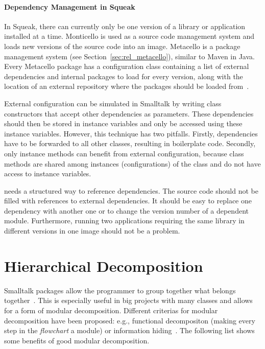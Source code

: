 \paragraph{Dependency Management in Squeak}
In Squeak, there can currently only be one version of a library or application installed at a time. Monticello is used as a source code management system and loads new versions of the source code into an image. Metacello is a package management system (see Section~\ref{sec:rel_metacello}), similar to Maven in Java. Every Metacello package has a configuration class containing a list of external dependencies and internal packages to load for every version, along with the location of an external repository where the packages should be loaded from~\cite{metacellodraft}.

External configuration can be simulated in Smalltalk by writing class constructors that accept other dependencies as parameters. These dependencies should then be stored in instance variables and only be accessed using these instance variables. However, this technique has two pitfalls. Firstly, dependencies have to be forwarded to all other classes, resulting in boilerplate code. Secondly, only instance methods can benefit from external configuration, because class methods are shared among instances (configurations) of the class and do not have access to instance variables.

\msname needs a structured way to reference dependencies. The source code should not be filled with references to external dependencies. It should be easy to replace one dependency with another one or to change the version number of a dependent module. Furthermore, running two applications requiring the same library in different versions in one image should not be a problem.

\section{Hierarchical Decomposition}
\label{sec:problem_hier_decomp}
Smalltalk packages allow the programmer to group together what belongs together~\cite{Eckel:2002:TJ:579108}. This is especially useful in big projects with many classes and allows for a form of modular decomposition. Different criterias for modular decomposition have been proposed: e.g., functional decompositon (making every step in the \emph{flowchart} a module) or information hiding~\cite{Parnas:1972:CUD:361598.361623, Parnas:1984:MSC:800054.801999}. The following list shows some benefits of good modular decomposition.

